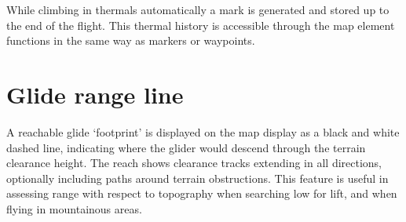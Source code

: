 While climbing in thermals automatically a mark is generated and stored up 
to the end of the flight. This thermal history is accessible through the map 
element functions in the same way as markers or waypoints.


\section{Glide range line}\label{sec:reach}

A reachable glide `footprint' is displayed on the map display as a
black and white dashed line, indicating where the glider would descend
through the terrain clearance height.  The reach shows clearance
tracks extending in all directions, optionally including paths around
terrain obstructions.  This feature is useful in assessing range with
respect to topography when searching low for lift, and when flying in
mountainous areas.

